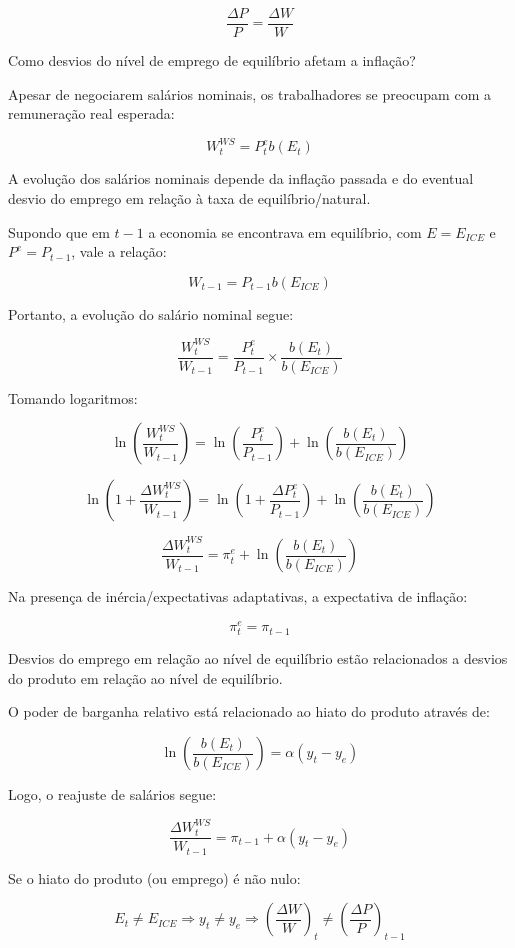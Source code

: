 \documentclass[a4paper,12pt]{article}[abntex2]
\begin{document}
\[
\frac{\Delta P}{P} = \frac{\Delta W}{W}
\]

Como desvios do nível de emprego de equilíbrio afetam a inflação?

Apesar de negociarem salários nominais, os trabalhadores se preocupam com a remuneração real esperada:

\[
W_t^{WS} = P_t^e b(E_t)
\]

A evolução dos salários nominais depende da inflação passada e do eventual desvio do emprego em relação à taxa de equilíbrio/natural.

Supondo que em \( t-1 \) a economia se encontrava em equilíbrio, com \( E = E_{ICE} \) e \( P^e = P_{t-1} \), vale a relação:

\[
W_{t-1} = P_{t-1} b(E_{ICE})
\]

Portanto, a evolução do salário nominal segue:

\[
\frac{W_t^{WS}}{W_{t-1}} = \frac{P_t^e}{P_{t-1}} \times \frac{b(E_t)}{b(E_{ICE})}
\]

Tomando logaritmos:

\[
\ln \left( \frac{W_t^{WS}}{W_{t-1}} \right) = \ln \left( \frac{P_t^e}{P_{t-1}} \right) + \ln \left( \frac{b(E_t)}{b(E_{ICE})} \right)
\]

\[
\ln \left( 1 + \frac{\Delta W_t^{WS}}{W_{t-1}} \right) = \ln \left( 1 + \frac{\Delta P_t^e}{P_{t-1}} \right) + \ln \left( \frac{b(E_t)}{b(E_{ICE})} \right)
\]

\[
\frac{\Delta W_t^{WS}}{W_{t-1}} = \pi_t^e + \ln \left( \frac{b(E_t)}{b(E_{ICE})} \right)
\]

Na presença de inércia/expectativas adaptativas, a expectativa de inflação:

\[
\pi_t^e = \pi_{t-1}
\]

Desvios do emprego em relação ao nível de equilíbrio estão relacionados a desvios do produto em relação ao nível de equilíbrio.

O poder de barganha relativo está relacionado ao hiato do produto através de:

\[
\ln \left( \frac{b(E_t)}{b(E_{ICE})} \right) = \alpha (y_t - y_e)
\]

Logo, o reajuste de salários segue:

\[
\frac{\Delta W_t^{WS}}{W_{t-1}} = \pi_{t-1} + \alpha (y_t - y_e)
\]

Se o hiato do produto (ou emprego) é não nulo:

\[
E_t \neq E_{ICE} \Rightarrow y_t \neq y_e \Rightarrow \left( \frac{\Delta W}{W} \right)_t \neq \left( \frac{\Delta P}{P} \right)_{t-1}
\]
\end{document}
